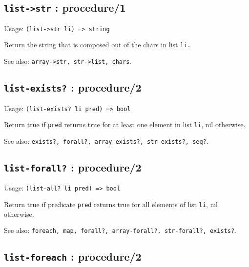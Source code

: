 \documentclass[
]{article}
\newcommand{\passthrough}[1]{#1}
\begin{document}
\hypertarget{list-str-procedure1-1}{%
\subsection{\texorpdfstring{\texttt{list-\textgreater{}str} :
procedure/1}{list-\textgreater str : procedure/1}}\label{list-str-procedure1-1}}

Usage: \passthrough{\lstinline!(list->str li) => string!}

Return the string that is composed out of the chars in list
\passthrough{\lstinline!li.!}

See also: \passthrough{\lstinline!array->str, str->list, chars!}.

\hypertarget{list-exists-procedure2-1}{%
\subsection{\texorpdfstring{\texttt{list-exists?} :
procedure/2}{list-exists? : procedure/2}}\label{list-exists-procedure2-1}}

Usage: \passthrough{\lstinline!(list-exists? li pred) => bool!}

Return true if \passthrough{\lstinline!pred!} returns true for at least
one element in list \passthrough{\lstinline!li!}, nil otherwise.

See also:
\passthrough{\lstinline!exists?, forall?, array-exists?, str-exists?, seq?!}.

\hypertarget{list-forall-procedure2-1}{%
\subsection{\texorpdfstring{\texttt{list-forall?} :
procedure/2}{list-forall? : procedure/2}}\label{list-forall-procedure2-1}}

Usage: \passthrough{\lstinline!(list-all? li pred) => bool!}

Return true if predicate \passthrough{\lstinline!pred!} returns true for
all elements of list \passthrough{\lstinline!li!}, nil otherwise.

See also:
\passthrough{\lstinline!foreach, map, forall?, array-forall?, str-forall?, exists?!}.

\hypertarget{list-foreach-procedure2-1}{%
\subsection{\texorpdfstring{\texttt{list-foreach} :
procedure/2}{list-foreach : procedure/2}}\label{list-foreach-procedure2-1}}
\end{document}
